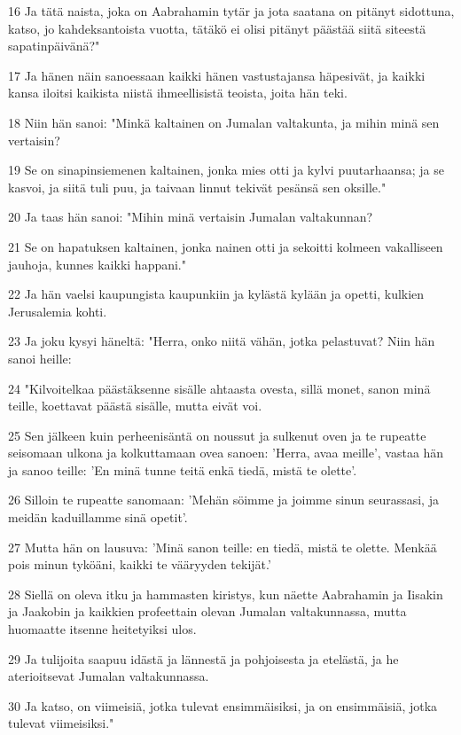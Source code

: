 \par 16 Ja tätä naista, joka on Aabrahamin tytär ja jota saatana on pitänyt sidottuna, katso, jo kahdeksantoista vuotta, tätäkö ei olisi pitänyt päästää siitä siteestä sapatinpäivänä?"
\par 17 Ja hänen näin sanoessaan kaikki hänen vastustajansa häpesivät, ja kaikki kansa iloitsi kaikista niistä ihmeellisistä teoista, joita hän teki.
\par 18 Niin hän sanoi: "Minkä kaltainen on Jumalan valtakunta, ja mihin minä sen vertaisin?
\par 19 Se on sinapinsiemenen kaltainen, jonka mies otti ja kylvi puutarhaansa; ja se kasvoi, ja siitä tuli puu, ja taivaan linnut tekivät pesänsä sen oksille."
\par 20 Ja taas hän sanoi: "Mihin minä vertaisin Jumalan valtakunnan?
\par 21 Se on hapatuksen kaltainen, jonka nainen otti ja sekoitti kolmeen vakalliseen jauhoja, kunnes kaikki happani."
\par 22 Ja hän vaelsi kaupungista kaupunkiin ja kylästä kylään ja opetti, kulkien Jerusalemia kohti.
\par 23 Ja joku kysyi häneltä: "Herra, onko niitä vähän, jotka pelastuvat? Niin hän sanoi heille:
\par 24 "Kilvoitelkaa päästäksenne sisälle ahtaasta ovesta, sillä monet, sanon minä teille, koettavat päästä sisälle, mutta eivät voi.
\par 25 Sen jälkeen kuin perheenisäntä on noussut ja sulkenut oven ja te rupeatte seisomaan ulkona ja kolkuttamaan ovea sanoen: 'Herra, avaa meille', vastaa hän ja sanoo teille: 'En minä tunne teitä enkä tiedä, mistä te olette'.
\par 26 Silloin te rupeatte sanomaan: 'Mehän söimme ja joimme sinun seurassasi, ja meidän kaduillamme sinä opetit'.
\par 27 Mutta hän on lausuva: 'Minä sanon teille: en tiedä, mistä te olette. Menkää pois minun tyköäni, kaikki te vääryyden tekijät.'
\par 28 Siellä on oleva itku ja hammasten kiristys, kun näette Aabrahamin ja Iisakin ja Jaakobin ja kaikkien profeettain olevan Jumalan valtakunnassa, mutta huomaatte itsenne heitetyiksi ulos.
\par 29 Ja tulijoita saapuu idästä ja lännestä ja pohjoisesta ja etelästä, ja he aterioitsevat Jumalan valtakunnassa.
\par 30 Ja katso, on viimeisiä, jotka tulevat ensimmäisiksi, ja on ensimmäisiä, jotka tulevat viimeisiksi."
